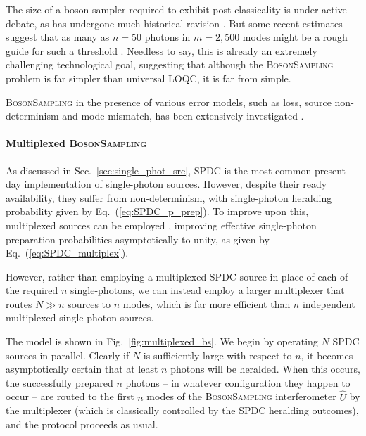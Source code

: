 The size of a boson-sampler required to exhibit post-classicality is under active debate, as has undergone much historical revision \cite{RohdeRalph}. But some recent estimates suggest that as many as \mbox{$n=50$} photons in \mbox{$m=2,500$} modes might be a rough guide for such a threshold \cite{NoSupBS_Montanaro}. Needless to say, this is already an extremely challenging technological goal, suggesting that although the \textsc{BosonSampling} problem is far simpler than universal LOQC, it is far from simple.

\textsc{BosonSampling} in the presence of various error models, such as loss, source non-determinism and mode-mismatch, has been extensively investigated \cite{bib:RohdeErrBS12, bib:RohdeSPDC13, bib:ScottLost16, bib:RohdeArbSpec15, bib:RandBS}. 

%
%

\paragraph{Multiplexed \textsc{BosonSampling}} 

As discussed in Sec.~\ref{sec:single_phot_src}, SPDC is the most common present-day implementation of single-photon sources. However, despite their ready availability, they suffer from non-determinism, with single-photon heralding probability given by Eq.~(\ref{eq:SPDC_p_prep}). To improve upon this, multiplexed sources can be employed \cite{bib:RohdeSPDC13}, improving effective single-photon preparation probabilities asymptotically to unity, as given by Eq.~(\ref{eq:SPDC_multiplex}).

However, rather than employing a multiplexed SPDC source in place of each of the required $n$ single-photons, we can instead employ a larger multiplexer that routes \mbox{$N\gg n$} sources to $n$ modes, which is far more efficient than $n$ independent multiplexed single-photon sources.

The model is shown in Fig.~\ref{fig:multiplexed_bs}. We begin by operating $N$ SPDC sources in parallel. Clearly if $N$ is sufficiently large with respect to $n$, it becomes asymptotically certain that at least $n$ photons will be heralded. When this occurs, the successfully prepared $n$ photons -- in whatever configuration they happen to occur -- are routed to the first $n$ modes of the \textsc{BosonSampling} interferometer $\hat{U}$ by the multiplexer (which is classically controlled by the SPDC heralding outcomes), and the protocol proceeds as usual.

